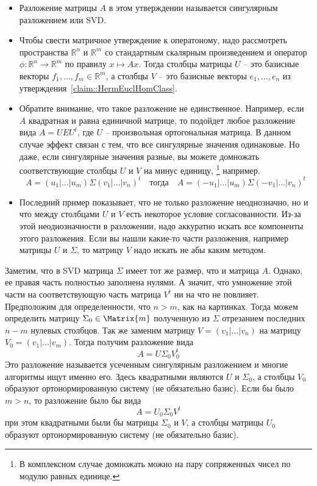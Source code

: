 \begin{itemize}
\item Разложение матрицы $A$ в этом утверждении называется сингулярным разложением или SVD.

\item
Чтобы свести матричное утверждение к оператоному, надо рассмотреть пространства $\mathbb R^n$ и $\mathbb R^m$ со стандартным скалярным произведением и оператор $\phi\colon \mathbb R^n \to \mathbb R^m$ по правилу $x\mapsto Ax$.
Тогда столбцы матрицы $U$ -- это базисные векторы $f_1,\ldots,f_m\in \mathbb R^m$, а столбцы $V$ -- это базисные векторы $e_1,\ldots,e_n$ из утверждения~\ref{claim::HermEuclHomClass}.

\item
Обратите внимание, что такое разложение не единственное.
Например, если $A$ квадратная и равна единичной матрице, то подойдет любое разложение вида $A = U E U^t$, где $U$ -- произвольная ортогональная матрица.
В данном случае эффект связан с тем, что все сингулярные значения одинаковые.
Но даже, если сингулярные значения разные, вы можете домножать соответствующие столбцы $U$ и $V$ на минус единицу,%
\footnote{В комплексном случае домножать можно на пару сопряженных чисел по модулю равных единице.}
например.
\[
A = (u_1|\ldots | u_m)\Sigma (v_1|\ldots|v_n)^t
\quad\text{тогда}\quad
A = (-u_1|\ldots | u_m)\Sigma (-v_1|\ldots|v_n)^t
\]

\item
Последний пример показывает, что не только разложение неоднозначно, но и что между столбцами $U$ и $V$ есть некоторое условие согласованности.
Из-за этой неоднозначности в разложении, надо аккуратно искать все компоненты этого разложения.
Если вы нашли какие-то части разложения, например матрицы $U$ и $\Sigma$, то матрицу $V$ надо искать не абы каким методом.
\end{itemize}

Заметим, что в SVD матрица $\Sigma$ имеет тот же размер, что и матрица $A$.
Однако, ее правая часть полностью заполнена нулями.
А значит, что умножение этой части на соответствующую часть матрица $V^t$ ни на что не повлияет.
Предположим для определенности, что $n > m$, как на картинках.
Тогда можем определить матрицу $\Sigma_0\in \Matrix{m}$ полученную из $\Sigma$ отрезанием последних $n - m$ нулевых столбцов.
Так же заменим матрицу $V = (v_1|\ldots|v_n)$ на матрицу $V_0 = (v_1|\ldots|v_m)$.
Тогда получим разложение вида 
\[
A = U \Sigma_0 V_0^t
\]
Это разложение называется усеченным сингулярным разложением и многие алгоритмы ищут именно его.
Здесь квадратными являются $U$ и $\Sigma_0$, а столбцы $V_0$ образуют ортонормированную систему (не обязательно базис).
Если бы было $m > n$, то разложение было бы вида
\[
A = U_0 \Sigma_0 V^t
\]
при этом квадратными были бы матрицы $\Sigma_0$ и $V$, а столбцы матрицы $U_0$ образуют ортонормированную систему (не обязательно базис).


